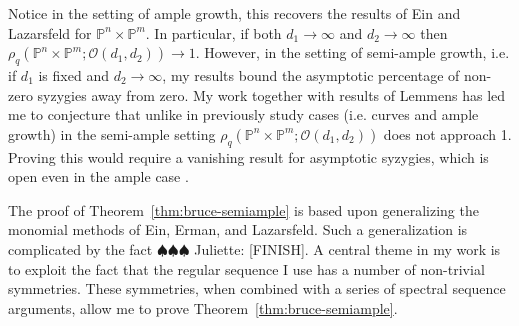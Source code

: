 \documentclass[11pt,reqno]{amsart}
\theoremstyle{remark}
\renewcommand{\O}{\mathcal{O}}
\renewcommand{\P}{\mathbb{P}}
\newcommand{\juliette}[1]{{\color{red} \sf $\spadesuit\spadesuit\spadesuit$ Juliette: [#1]}}
\begin{document}
Notice in the setting of ample growth, this recovers the results of Ein and Lazarsfeld for $\P^n\times\P^m$. In particular, if both $d_{1}\to \infty$ and $d_{2}\to\infty$ then $\rho_{q}\left(\P^{n}\times\P^{m}; \O(d_1,d_2)\right)\to 1$. However, in the setting of semi-ample growth, i.e. if $d_{1}$ is fixed and $d_{2}\to \infty$, my results bound the asymptotic percentage of non-zero syzygies away from zero. My work together with results of Lemmens \cite{lemmens18} has led me to conjecture that unlike in previously study cases (i.e. curves and ample growth) in the semi-ample setting $\rho_{q}\left(\P^{n}\times\P^{m}; \O(d_1,d_2)\right)$ does not approach 1. Proving this would require a vanishing result for asymptotic syzygies, which is open even in the ample case  \cite[Conjectures~7.1,~7.5]{einLazarsfeld12}.





The proof of Theorem~\ref{thm:bruce-semiample} is based upon generalizing the monomial methods of Ein, Erman, and Lazarsfeld. Such a generalization is complicated by the fact \juliette{FINISH}. A central theme in my work is to exploit the fact that the regular sequence I use has a number of non-trivial symmetries. These symmetries, when combined with a series of spectral sequence arguments, allow me to prove Theorem~\ref{thm:bruce-semiample}.
\end{document}
